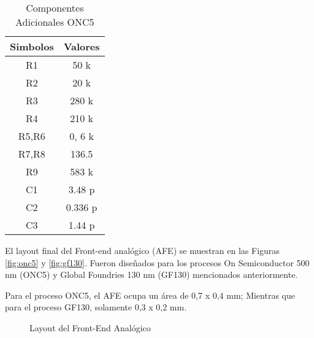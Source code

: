 \begin{table}[H]
\centering
\begin{tabular}{c|c}
\textbf{Simbolos} 	&	\textbf{Valores} \\ \hline
R1              	& 50 k           \\
R2              	& 20 k           \\
R3           	    & 280 k          \\
R4           	    & 210 k          \\
R5,R6           	& 0, 6 k         \\
R7,R8           	& 136.5          \\
R9              	& 583 k          \\
C1              	& 3.48 p         \\
C2              	& 0.336 p        \\
C3              	& 1.44 p        \\

\end{tabular}
\caption{Componentes Adicionales ONC5}
\label{table:res_specs_500}
\end{table}

El layout final del Front-end analógico (AFE) se muestran en las Figuras \ref{fig:onc5} y \ref{fig:gf130}. Fueron diseñados para los procesos On Semiconductor 500 nm (ONC5) y Global Foundries 130 nm (GF130) mencionados anteriormente. 

Para el proceso ONC5, el AFE ocupa un área de 0,7 x 0,4 mm; Mientras que para el proceso GF130, solamente 0,3 x 0,2 mm. 

\begin{figure}[H]


\caption{Layout del Front-End Analógico}
\label{fig:layout_completo}
\end{figure}


